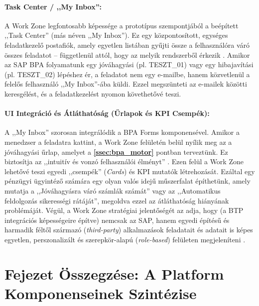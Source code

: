 \paragraph{Task Center / ,,My Inbox'':}
A Work Zone legfontosabb képessége a prototípus szempontjából a beépített ,,Task Center'' (más néven ,,My Inbox'').
Ez egy központosított, egységes feladatkezelő postafiók, amely egyetlen listában gyűjti össze a felhasználóra váró összes feladatot – függetlenül attól, hogy az melyik rendszerből érkezik \cite{SAP-WZ-Standard}.
Amikor az SAP BPA folyamatunk egy jóváhagyási (pl. TESZT\_01) vagy egy hibajavítási (pl. TESZT\_02) lépéshez ér, a feladatot nem egy e-mailbe, hanem közvetlenül a felelős felhasználó ,,My Inbox''-ába küldi.
Ezzel megszünteti az e-mailek közötti keresgélést, és a feladatkezelést nyomon követhetővé teszi.
\paragraph{UI Integráció és Átláthatóság (Űrlapok és KPI Csempék):}
A ,,My Inbox'' szorosan integrálódik a BPA Forms komponensével.
Amikor a menedzser a feladatra kattint, a Work Zone felületén belül nyílik meg az a jóváhagyási űrlap, amelyet a \textbf{\ref{ssec:bpa_motor}} pontban terveztünk.
Ez biztosítja az ,,intuitív és vonzó felhasználói élményt'' \cite{SAP-WZ-Standard}.
Ezen felül a Work Zone lehetővé teszi egyedi ,,csempék'' (\textit{Cards}) és KPI mutatók létrehozását.
Ezáltal egy pénzügyi ügyintéző számára egy olyan valós idejű műszerfalat építhetünk, amely mutatja a ,,Jóváhagyásra váró számlák számát'' vagy az ,,Automatikus feldolgozás sikerességi rátáját'', megoldva ezzel az átláthatóság hiányának problémáját.
Végül, a Work Zone stratégiai jelentőségét az adja, hogy (a BTP integrációs képességeire építve) nemcsak az SAP, hanem egyedi építésű és harmadik féltől származó (\textit{third-party}) alkalmazások feladatait és adatait is képes egyetlen, perszonalizált és szerepkör-alapú (\textit{role-based}) felületen megjeleníteni \cite{SAP-Work-Zone}.
\section{Fejezet Összegzése: A Platform Komponenseinek Szintézise}
\label{sec:fejezet_osszegzes_2}


